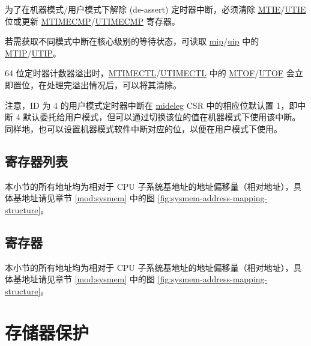 \documentclass[main\_\_CN.tex]{subfiles}
\begin{document}
为了在机器模式/用户模式下解除 (de-assert) 定时器中断，必须清除 \hyperref[fielddesc:CLINTMTIMECTLMTIE]{MTIE}/\hyperref[fielddesc:CLINTUTIMECTLUTIE]{UTIE} 位或更新 \hyperref[regdesc:CLINTMTIMECMPREG]{MTIMECMP}/\hyperref[regdesc:CLINTUTIMECMPREG]{UTIMECMP} 寄存器。

若需获取不同模式中断在核心级别的等待状态，可读取 \hyperref[regdesc:MIP]{mip}/\hyperref[regdesc:UIP]{uip} 中的 \hyperref[fielddesc:MIPMTIP]{MTIP}/\hyperref[fielddesc:UIPUTIP]{UTIP}。

64 位定时器计数器溢出时，\hyperref[regdesc:CLINTMTIMECTLREG]{MTIMECTL}/\hyperref[regdesc:CLINTUTIMECTLREG]{UTIMECTL} 中的 \hyperref[fielddesc:CLINTMTIMECTLMTOF]{MTOF}/\hyperref[fielddesc:CLINTUTIMECTLUTOF]{UTOF} 会立即置位，在处理完溢出情况后，可以将其清除。

注意，ID 为 4 的用户模式定时器中断在 \hyperref[regdesc:MIDELEG]{mideleg} CSR 中的相应位默认置 1，即中断 4 默认委托给用户模式，但可以通过切换该位的值在机器模式下使用该中断。同样地，也可以设置机器模式软件中断对应的位，以便在用户模式下使用。


\hypertarget{riscvcpu-clint-reg-summ}{}
\subsection{寄存器列表}
\label{sec:riscvcpu-clint-reg-summ}

本小节的所有地址均为相对于 CPU 子系统基地址的地址偏移量（相对地址），具体基地址请见章节 \ref{mod:sysmem} \textit{} 中的图 \ref{fig:sysmem-address-mapping-structure}。




\subsection{寄存器}

本小节的所有地址均为相对于 CPU 子系统基地址的地址偏移量（相对地址），具体基地址请见章节 \ref{mod:sysmem} \textit{} 中的图 \ref{fig:sysmem-address-mapping-structure}。





\clearpage
\section{存储器保护}
\label{sec:riscvcpu-pmp}
\end{document}
